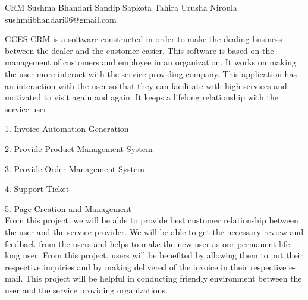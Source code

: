  \begin{conf-abstract}[]
 {CRM}
 {Sushma Bhandari
 	 Sandip Sapkota
 	  Tahira Urusha Niroula
 }
{sushmiibhandari06@gmail.com}

GCES CRM is a software constructed in order to make the dealing business between the dealer and the customer easier. This software is based on the management of customers and employee in an organization. It works on making the user more interact with the service providing company. This application has an interaction with the user so that they can facilitate with high services and motivated to visit again and again. It keeps a lifelong relationship with the service user.

1. Invoice Automation Generation

2. Provide Product Management System

3. Provide Order Management System

4. Support Ticket

5. Page Creation and Management
\\
From this project, we will be able to provide best customer relationship
between the user and the service provider. We will be able to get the
necessary review and feedback from the users and helps to make the
new user as our permanent life-long user. From this project, users will
be benefited by allowing them to put their respective inquiries and by
making delivered of the invoice in their respective e-mail. This project will
be helpful in conducting friendly environment between the user and the
service providing organizations.

 \end{conf-abstract}
